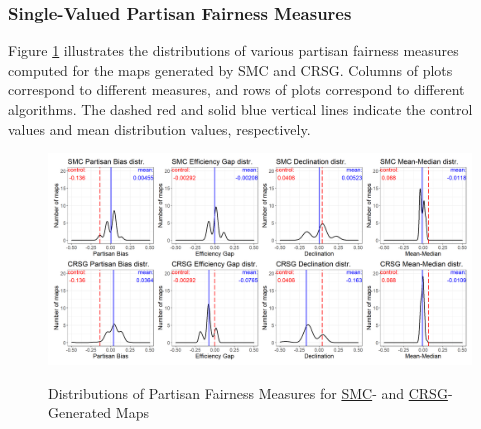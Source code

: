 \subsubsection{Single-Valued Partisan Fairness Measures}

Figure \ref{fig:fair.density} illustrates the distributions of various partisan fairness measures computed for the maps generated by SMC and CRSG. Columns of plots correspond to different measures, and rows of plots correspond to different algorithms. The dashed red and solid blue vertical lines indicate the control values and mean distribution values, respectively. 

\begin{landscape}
    \begin{figure}[h]
        \caption{Distributions of Partisan Fairness Measures for \hyperref[sec:smc]{SMC}- and \hyperref[sec:crsg]{CRSG}-Generated Maps}
        \includegraphics{img/fair.density.png}
        \label{fig:fair.density}
        \raggedright
    \end{figure}
\end{landscape}